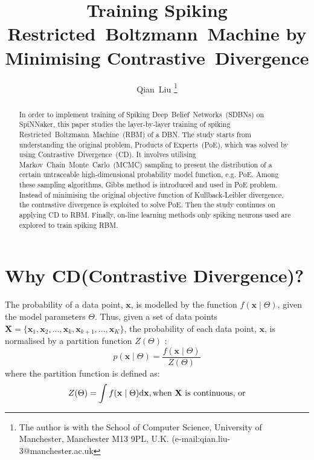 \documentclass[11pt,twoside,a4paper]{article}
\def\D{\mathrm{d}}
\begin{document}
	\title{Training Spiking Restricted~Boltzmann~Machine by Minimising Contrastive~Divergence}
	\author{
	Qian~Liu
	\thanks{
	The author is with the School of Computer Science, University of Manchester, Manchester M13 9PL, U.K. 
	(e-mail:qian.liu-3@manchester.ac.uk}
	}
	\maketitle
	\thispagestyle{empty}

\begin{abstract}
	In order to implement training of Spiking Deep~Belief~Networks~(SDBNs) on SpiNNaker, this paper studies the layer-by-layer training of spiking Restricted~Boltzmann~Machine~(RBM) of a DBN.
	The study starts from understanding the original problem, Products of Experts~(PoE), which was solved by using Contrastive~Divergence~(CD).
	It involves utilising Markov~Chain~Monte~Carlo~(MCMC) sampling to present the distribution of a certain untraceable high-dimensional probability model function, e.g. PoE.
	Among these sampling algorithms, Gibbs method is introduced and used in PoE problem.
	Instead of minimising the original objective function of Kullback-Leibler divergence, the contrastive divergence is exploited to solve PoE.
	Then the study continues on applying CD to RBM.
	Finally, on-line learning methods only spiking neurons used are explored to train spiking RBM.
\end{abstract}

\section{Why CD(Contrastive Divergence)?\cite{hinton2002training,woodfordnotes}}
	The probability of a data point, $ \mathbf{x} $,  is modelled by the function $f(\mathbf{x} \mid \Theta )$, given the model parameters $ \Theta $. 
	Thus, given a set of data points $ \mathbf{X}=\{\mathbf{x}_1, \mathbf{x}_2, ..., \mathbf{x}_k, \mathbf{x}_{k+1}, ..., \mathbf{x}_K\} $, the probability of each data point,  $ \mathbf{x} $, is normalised by a partition function $Z( \Theta)$ :
	\begin{equation}
	p(\mathbf{x} \mid \Theta ) = \dfrac{f(\mathbf{x} \mid \Theta )}{Z( \Theta)}
	\end{equation}
	where the partition function is defined as:
	\begin{equation}
	\label{equ:z_int}
	Z( \Theta) = \int f(\mathbf{x} \mid \Theta )\D\mathbf{x}, \text{when  $ \mathbf{X} $ is continuous, or}
	\end{equation}
	
\end{document}
